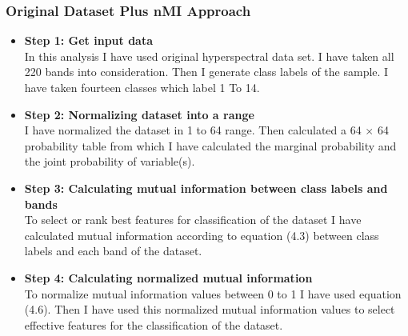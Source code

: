\documentclass[document.tex]{subfiles}
\begin{document}
\subsubsection{Original Dataset Plus nMI Approach}
\begin{itemize}
	\item \textbf{Step 1: Get input data}\\
	In this analysis I have used original hyperspectral data set. I have taken all 220 bands into consideration. Then I generate class labels of the sample. I have taken
	fourteen classes which label 1 To 14.
	\item \textbf{Step 2: Normalizing dataset into a range}\\
	I have normalized the dataset in 1 to 64 range. Then calculated a 64 $\times$ 64 probability table from which I have calculated the marginal probability and the joint probability of variable(s). 
	\item \textbf{Step 3: Calculating mutual information between class labels and bands}\\
	To select or rank best features for classification of the dataset I have calculated mutual information according to equation (4.3) between class labels and each band of the dataset.
	\item \textbf{Step 4: Calculating normalized mutual information}\\
	To normalize mutual information values between 0 to 1 I have used equation (4.6). Then I have used this normalized mutual information values to select effective features for the classification of the dataset. 
\end{itemize}
\end{document}
